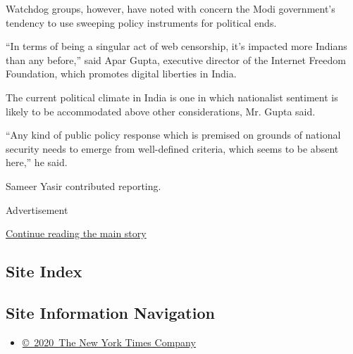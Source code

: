 Watchdog groups, however, have noted with concern the Modi government's
tendency to use sweeping policy instruments for political ends.

``In terms of being a singular act of web censorship, it's impacted more
Indians than any before,'' said Apar Gupta, executive director of the
Internet Freedom Foundation, which promotes digital liberties in India.

The current political climate in India is one in which nationalist
sentiment is likely to be accommodated above other considerations, Mr.
Gupta said.

``Any kind of public policy response which is premised on grounds of
national security needs to emerge from well-defined criteria, which
seems to be absent here,'' he said.

Sameer Yasir contributed reporting.

Advertisement

\protect\hyperlink{after-bottom}{Continue reading the main story}

\hypertarget{site-index}{%
\subsection{Site Index}\label{site-index}}

\hypertarget{site-information-navigation}{%
\subsection{Site Information
Navigation}\label{site-information-navigation}}

\begin{itemize}
\tightlist
\item
  \href{https://help.nytimes3xbfgragh.onion/hc/en-us/articles/115014792127-Copyright-notice}{©~2020~The
  New York Times Company}
\end{itemize}


